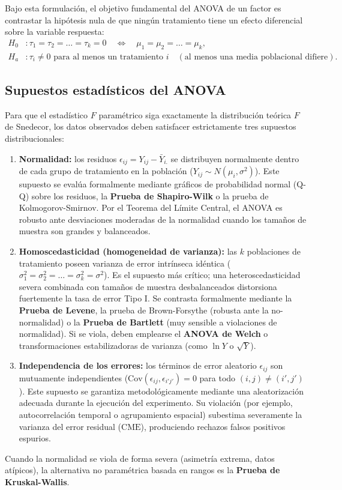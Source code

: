 Bajo esta formulación, el objetivo fundamental del ANOVA de un factor es contrastar la hipótesis nula de que ningún tratamiento tiene un efecto diferencial sobre la variable respuesta:
\begin{align}
	H_0&: \tau_1 = \tau_2 = \ldots = \tau_k = 0 \quad \Longleftrightarrow \quad \mu_1 = \mu_2 = \ldots = \mu_k, \\
	H_a&: \tau_i \neq 0 \text{ para al menos un tratamiento } i \quad (\text{al menos una media poblacional difiere}).
\end{align}

\subsection{Supuestos estadísticos del ANOVA}

Para que el estadístico $F$ paramétrico siga exactamente la distribución teórica $F$ de Snedecor, los datos observados deben satisfacer estrictamente tres supuestos distribucionales:
\begin{enumerate}
	\item \textbf{Normalidad:} los residuos $\epsilon_{ij} = Y_{ij} - \bar{Y}_{i.}$ se distribuyen normalmente dentro de cada grupo de tratamiento en la población ($Y_{ij} \sim N(\mu_i, \sigma^2)$). Este supuesto se evalúa formalmente mediante gráficos de probabilidad normal (Q-Q) sobre los residuos, la \textbf{Prueba de Shapiro-Wilk} o la prueba de Kolmogorov-Smirnov. Por el Teorema del Límite Central, el ANOVA es robusto ante desviaciones moderadas de la normalidad cuando los tamaños de muestra son grandes y balanceados.
	\item \textbf{Homoscedasticidad (homogeneidad de varianza):} las $k$ poblaciones de tratamiento poseen varianza de error intrínseca idéntica ($\sigma_1^2 = \sigma_2^2 = \ldots = \sigma_k^2 = \sigma^2$). Es el supuesto más crítico; una heteroscedasticidad severa combinada con tamaños de muestra desbalanceados distorsiona fuertemente la tasa de error Tipo I. Se contrasta formalmente mediante la \textbf{Prueba de Levene}, la prueba de Brown-Forsythe (robusta ante la no-normalidad) o la \textbf{Prueba de Bartlett} (muy sensible a violaciones de normalidad). Si se viola, deben emplearse el \textbf{ANOVA de Welch} o transformaciones estabilizadoras de varianza (como $\ln Y$ o $\sqrt{Y}$).
	\item \textbf{Independencia de los errores:} los términos de error aleatorio $\epsilon_{ij}$ son mutuamente independientes ($\text{Cov}(\epsilon_{ij}, \epsilon_{i'j'}) = 0$ para todo $(i,j) \neq (i',j')$). Este supuesto se garantiza metodológicamente mediante una aleatorización adecuada durante la ejecución del experimento. Su violación (por ejemplo, autocorrelación temporal o agrupamiento espacial) subestima severamente la varianza del error residual ($\text{CME}$), produciendo rechazos falsos positivos espurios.
\end{enumerate}
Cuando la normalidad se viola de forma severa (asimetría extrema, datos atípicos), la alternativa no paramétrica basada en rangos es la \textbf{Prueba de Kruskal-Wallis}.

